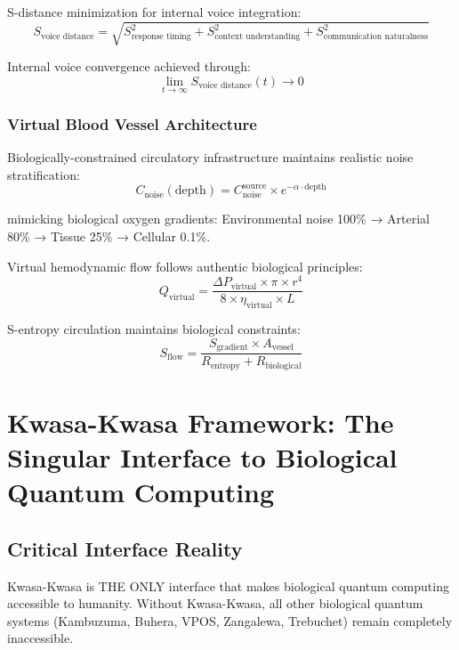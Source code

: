 ﻿\documentclass[11pt,a4paper]{article}
\begin{document}
S-distance minimization for internal voice integration:
\begin{equation}
S_{\text{voice distance}} = \sqrt{S_{\text{response timing}}^2 + S_{\text{context understanding}}^2 + S_{\text{communication naturalness}}^2}
\end{equation}

Internal voice convergence achieved through:
\begin{equation}
\lim_{t \rightarrow \infty} S_{\text{voice distance}}(t) \rightarrow 0
\end{equation}

\subsubsection{Virtual Blood Vessel Architecture}

Biologically-constrained circulatory infrastructure maintains realistic noise stratification:
\begin{equation}
C_{\text{noise}}(\text{depth}) = C_{\text{noise}}^{\text{source}} \times e^{-\alpha \cdot \text{depth}}
\end{equation}

mimicking biological oxygen gradients: Environmental noise 100\% → Arterial 80\% → Tissue 25\% → Cellular 0.1\%.

Virtual hemodynamic flow follows authentic biological principles:
\begin{equation}
Q_{\text{virtual}} = \frac{\Delta P_{\text{virtual}} \times \pi \times r^4}{8 \times \eta_{\text{virtual}} \times L}
\end{equation}

S-entropy circulation maintains biological constraints:
\begin{equation}
S_{\text{flow}} = \frac{S_{\text{gradient}} \times A_{\text{vessel}}}{R_{\text{entropy}} + R_{\text{biological}}}
\end{equation}

\section{Kwasa-Kwasa Framework: The Singular Interface to Biological Quantum Computing}

\subsection{Critical Interface Reality}

Kwasa-Kwasa is THE ONLY interface that makes biological quantum computing accessible to humanity. Without Kwasa-Kwasa, all other biological quantum systems (Kambuzuma, Buhera, VPOS, Zangalewa, Trebuchet) remain completely inaccessible.
\end{document}
